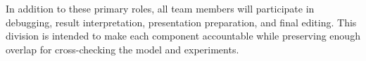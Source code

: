 \documentclass[9pt,a4paper,twocolumn,twoside]{tau-class/tau}
\begin{document}
    In addition to these primary roles, all team members will participate in debugging, result interpretation, presentation preparation, and final editing. This division is intended to make each component accountable while preserving enough overlap for cross-checking the model and experiments.


\printbibliography

\end{document}
